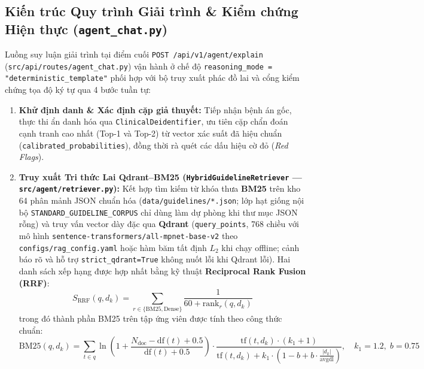 \subsection{Kiến trúc Quy trình Giải trình \& Kiểm chứng Hiện thực (\texttt{agent\_chat.py})}
Luồng suy luận giải trình tại điểm cuối \texttt{POST /api/v1/agent/explain} (\texttt{src/api/routes/agent\_chat.py}) vận hành ở chế độ \texttt{reasoning\_mode = "deterministic\_template"} phối hợp với bộ truy xuất phác đồ lai và cổng kiểm chứng tọa độ ký tự qua 4 bước tuần tự:
\begin{enumerate}[leftmargin=1.8em, itemsep=0.2em]
    \item \textbf{Khử định danh \& Xác định cặp giả thuyết:} Tiếp nhận bệnh án gốc, thực thi ẩn danh hóa qua \texttt{ClinicalDeidentifier}, ưu tiên cặp chẩn đoán cạnh tranh cao nhất (Top-1 và Top-2) từ vector xác suất đã hiệu chuẩn (\texttt{calibrated\_probabilities}), đồng thời rà quét các dấu hiệu cờ đỏ (\textit{Red Flags}).
    \item \textbf{Truy xuất Tri thức Lai Qdrant--BM25 (\texttt{HybridGuidelineRetriever} --- \texttt{src/agent/retriever.py}):} Kết hợp tìm kiếm từ khóa thưa \textbf{BM25} trên kho 64 phân mảnh JSON chuẩn hóa (\texttt{data/guidelines/*.json}; lớp hạt giống nội bộ \texttt{STANDARD\_GUIDELINE\_CORPUS} chỉ dùng làm dự phòng khi thư mục JSON rỗng) và truy vấn vector dày đặc qua \textbf{Qdrant} (\texttt{query\_points}, 768 chiều với mô hình \texttt{sentence-transformers/all-mpnet-base-v2} theo \texttt{configs/rag\_config.yaml} hoặc hàm băm tất định $L_2$ khi chạy offline; cảnh báo rõ và hỗ trợ \texttt{strict\_qdrant=True} không nuốt lỗi khi Qdrant lỗi). Hai danh sách xếp hạng được hợp nhất bằng kỹ thuật \textbf{Reciprocal Rank Fusion (RRF)}:
    \begin{equation}
        S_{\text{RRF}}(q, d_k) = \sum_{r \in \{\text{BM25}, \text{Dense}\}} \frac{1}{60 + \text{rank}_r(q, d_k)}
    \end{equation}
    trong đó thành phần BM25 trên tập ứng viên được tính theo công thức chuẩn:
    \begin{equation}
        \text{BM25}(q, d_k) = \sum_{t \in q} \ln\!\left(1 + \frac{N_{\text{doc}} - \text{df}(t) + 0.5}{\text{df}(t) + 0.5}\right) \cdot \frac{\text{tf}(t, d_k) \cdot (k_1 + 1)}{\text{tf}(t, d_k) + k_1 \cdot \left(1 - b + b \cdot \frac{|d_k|}{\text{avgdl}}\right)}, \quad k_1 = 1.2,\; b = 0.75
    \end{equation}
    \begin{itemize}[leftmargin=1.5em, itemsep=0.15em]

\end{itemize}
\end{enumerate}
